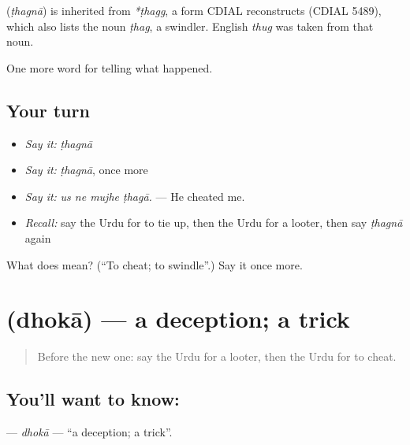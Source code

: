 \begin{cousinweb}
\textbf{} (\emph{ṭhagnā}) is inherited from \emph{*ṭhagg}, a form CDIAL reconstructs (CDIAL 5489), which also lists the noun \emph{ṭhag}, a swindler. English \emph{thug} was taken from that noun.
\end{cousinweb}

\begin{grammarlens}[title={What you've built}]
One more word for telling what happened.
\end{grammarlens}

\subsection*{Your turn}
\begin{itemize}
\raggedright
  \item \emph{Say it:} \emph{ṭhagnā}
  \item \emph{Say it:} \emph{ṭhagnā}, once more
  \item \emph{Say it:} \emph{us ne mujhe ṭhagā.} — He cheated me.
  \item \emph{Recall:} say the Urdu for to tie up, then the Urdu for a looter, then say \emph{ṭhagnā} again
\end{itemize}

\begin{tcolorbox}[breakable,colback=teal!4,colframe=teal!35!black,title={Before you move on}]
What does  mean? (\textquotedblleft{}To cheat; to swindle\textquotedblright{}.) Say it once more.
\end{tcolorbox}
\section[\texorpdfstring{\ur{دھوکا} (dhokā)}{دھوکا (dhokā)}]{ (dhokā) — a deception; a trick}

\label{lesson:UR-C281-dhoka}



\begin{quote}
Before the new one: say the Urdu for a looter, then the Urdu for to cheat.
\end{quote}

\subsection*{You'll want to know: }
\textbf{} — \emph{dhokā} — \textquotedblleft{}a deception; a trick\textquotedblright{}.

